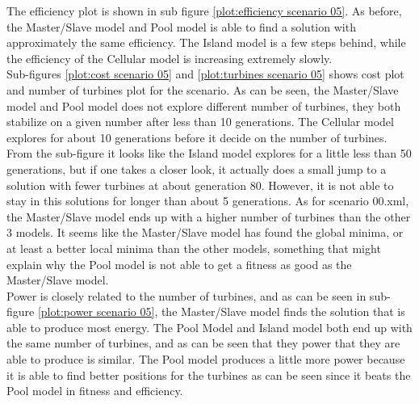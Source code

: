 \noindent The efficiency plot is shown in sub figure \ref{plot:efficiency scenario 05}. As before, the Master/Slave model and Pool model is able to find a solution with approximately the same efficiency. The Island model is a few steps behind, while the efficiency of the Cellular model is increasing extremely slowly. \\


\noindent Sub-figures \ref{plot:cost scenario 05} and \ref{plot:turbines scenario 05} shows cost plot and number of turbines plot for the scenario. As can be seen, the Master/Slave model and Pool model does not explore different number of turbines, they both stabilize on a given number after less than 10 generations. The Cellular model explores for about 10 generations before it decide on the number of turbines. From the sub-figure it looks like the Island model explores for a little less than 50 generations, but if one takes a closer look, it actually does a small jump to a solution with fewer turbines at about generation 80. However, it is not able to stay in this solutions for longer than about 5 generations. As for scenario 00.xml, the Master/Slave model ends up with a higher number of turbines than the other 3 models. It seems like the Master/Slave model has found the global minima, or at least a better local minima than the other models, something that might explain why the Pool model is not able to get a fitness as good as the Master/Slave model.\\


\noindent Power is closely related to the number of turbines, and as can be seen in sub-figure \ref{plot:power scenario 05}, the Master/Slave model finds the solution that is able to produce most energy. The Pool Model and Island model both end up with the same number of turbines, and as can be seen that they power that they are able to produce is similar. The Pool model produces a little more power because it is able to find better positions for the turbines as can be seen since it beats the Pool model in fitness and efficiency. \\


